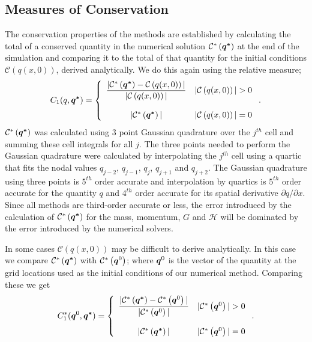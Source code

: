 \subsection{Measures of Conservation}
The conservation properties of the methods are established by calculating the total of a conserved quantity in the numerical solution $\mathcal{C}^*\left({\boldsymbol{q^*}}\right)$ at the end of the simulation and comparing it to the total of that quantity for the initial conditions $\mathcal{C}\left({q(x,0)} \right)$, derived analytically. We do this again using the relative measure;
\begin{equation}
C_1(q,\boldsymbol{q^*}) =  \left\lbrace \begin{array}{c r} 
\dfrac{|\mathcal{C}^*\left({\boldsymbol{q^*}}\right) - \mathcal{C}\left({q(x,0)} \right)| }{|\mathcal{C}\left({q(x,0)} \right)|} & |\mathcal{C}\left({q(x,0)} \right)| > 0 \\ \\
|\mathcal{C}^*\left({\boldsymbol{q^*}}\right)| & |\mathcal{C}\left({q(x,0)} \right)| = 0  \end{array}\right. . 
\label{eqn:C1qdef} 
\end{equation}
$\mathcal{C}^*\left({\boldsymbol{q^*}}\right)$ was calculated using 3 point Gaussian quadrature over the $j^{th}$ cell and summing these cell integrals for all $j$. The three points needed to perform the Gaussian quadrature were calculated by interpolating the $j^{th}$ cell using a quartic that fits the nodal values $q_{j-2}$, $q_{j-1}$, $q_{j}$, $q_{j+1}$ and $q_{j+2}$. The Gaussian quadrature using three points is $5^{th}$ order accurate and interpolation by quartics is $5^{th}$ order accurate for the quantity $q$ and $4^{th}$ order accurate for its spatial derivative $\partial q /  \partial x$. Since all methods are third-order accurate or less, the error introduced by the calculation of $\mathcal{C}^*\left({\boldsymbol{q^*}}\right)$ for the mass, momentum, $G$ and $\mathcal{H}$ will be dominated by the error introduced by the numerical solvers.

In some cases $\mathcal{C}\left({q(x,0)} \right)$ may be difficult to derive analytically. In this case we compare $\mathcal{C}^*\left(\boldsymbol{q^*}\right)$ with $\mathcal{C}^*\left(\boldsymbol{q}^0\right)$; where $\boldsymbol{q}^0$ is the vector of the quantity at the grid locations used as the initial conditions of our numerical method. Comparing these we get 
\begin{equation}
C^*_1({\boldsymbol{q}^0},\boldsymbol{q^*}) =  \left\lbrace \begin{array}{c r} 
\dfrac{|\mathcal{C}^*\left({\boldsymbol{q^*}}\right) - \mathcal{C}^*\left({\boldsymbol{q}^0}\right)| }{|\mathcal{C}^*\left({\boldsymbol{q}^0}\right)|} & |\mathcal{C}^*\left({\boldsymbol{q}^0}\right)| > 0 \\ \\
|\mathcal{C}^*\left({\boldsymbol{q^*}}\right)| & |\mathcal{C}^*\left({\boldsymbol{q}^0}\right)| = 0  \end{array}\right. . 
\label{eqn:C*1qdef} 
\end{equation}


